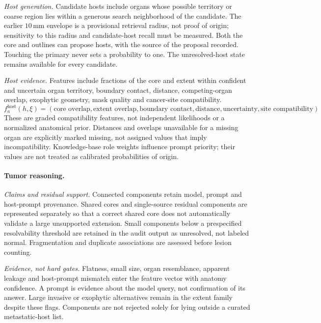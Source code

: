 \documentclass[fleqn,10pt]{olplainarticle}
\begin{document}
\emph{Host generation.} Candidate hosts include organs whose possible territory or coarse region lies within a generous
search neighborhood of the candidate. The earlier $10$\,mm envelope is a provisional retrieval radius, not proof of origin;
sensitivity to this radius and candidate-host recall must be measured. Both the core and outlines can propose hosts, with
the source of the proposal recorded. Touching the primary never sets a probability to one. The unresolved-host state
remains available for every candidate.

\emph{Host evidence.} Features include fractions of the core and extent within confident and uncertain organ territory,
boundary contact, distance, competing-organ overlap, exophytic geometry, mask quality and cancer-site compatibility.
\begin{equation}
\label{eq:host_prior}
f_a^{\mathrm{host}}(h,\xi)=
(\text{core overlap},\text{extent overlap},\text{boundary contact},
\text{distance},\text{uncertainty},\text{site compatibility}).
\end{equation}
These are graded compatibility features, not independent likelihoods or a normalized anatomical prior. Distances and
overlaps unavailable for a missing organ are explicitly marked missing, not assigned values that imply incompatibility.
Knowledge-base role weights influence prompt priority; their values are not treated as calibrated probabilities of origin.

\paragraph{Tumor reasoning.}
\label{sec:tumor_details}
\emph{Claims and residual support.} Connected components retain model, prompt and host-prompt provenance. Shared cores and
single-source residual components are represented separately so that a correct shared core does not automatically validate
a large unsupported extension. Small components below a prespecified resolvability threshold are retained in the audit
output as unresolved, not labeled normal. Fragmentation and duplicate associations are assessed before lesion counting.

\emph{Evidence, not hard gates.} Flatness, small size, organ resemblance, apparent leakage and host-prompt mismatch enter
the feature vector with anatomy confidence. A prompt is evidence about the model query, not confirmation of its answer.
Large invasive or exophytic alternatives remain in the extent family despite these flags. Components are not rejected
solely for lying outside a curated metastatic-host list.
\end{document}
